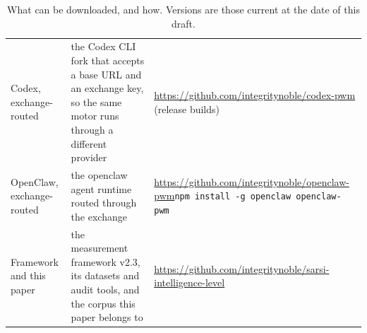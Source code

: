 \documentclass[11pt]{article}
\newcommand{\cmd}[1]{\texttt{#1}}
\theoremstyle{definition}
\begin{document}
\begin{table}[H]
\begin{tabularx}{\textwidth}{@{}lYY@{}}
Codex, exchange-routed & the Codex CLI fork that accepts a base URL and an exchange key, so the same motor runs through a different provider & \url{https://github.com/integritynoble/codex-pwm} (release builds) \\
OpenClaw, exchange-routed & the openclaw agent runtime routed through the exchange & \url{https://github.com/integritynoble/openclaw-pwm}\newline \cmd{npm install -g openclaw}\allowbreak\cmd{ openclaw-pwm} \\
Framework and this paper & the measurement framework v2.3, its datasets and audit tools, and the corpus this paper belongs to & \url{https://github.com/integritynoble/sarsi-intelligence-level} \\
\bottomrule
\end{tabularx}
\caption{What can be downloaded, and how. Versions are those current at the date of this draft.}
\label{tab:downloads}
\end{table}
\end{document}
